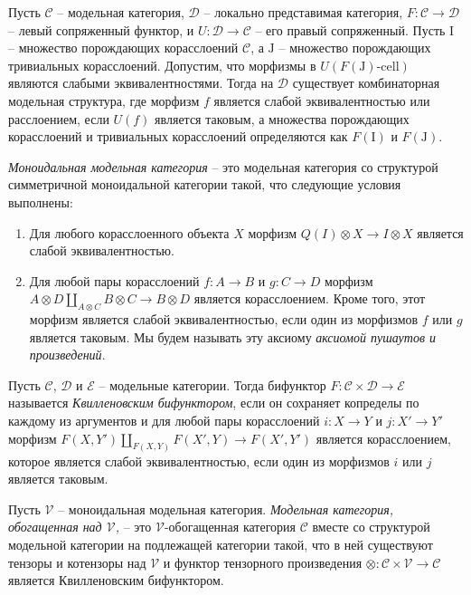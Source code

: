 \documentclass[reqno]{amsart}
\theoremstyle{definition}
\theoremstyle{remark}
\newcommand{\cat}[1]{\mathcal{#1}}
\renewcommand{\C}{\cat{C}}
\newcommand{\D}{\cat{D}}
\newcommand{\I}{\mathrm{I}}
\newcommand{\J}{\mathrm{J}}
\newcommand{\class}[2]{#1\text{-}\mathrm{#2}}
\newcommand{\Icell}[1][\I]{\class{#1}{cell}}
\begin{document}
\begin{prop}[transferred]
Пусть $\C$ -- модельная категория, $\D$ -- локально представимая категория, $F : \C \to \D$ -- левый сопряженный функтор, и $U : \D \to \C$ -- его правый сопряженный.
Пусть $\I$ -- множество порождающих корасслоений $\C$, а $\J$ -- множество порождающих тривиальных корасслоений.
Допустим, что морфизмы в $U(\Icell[F(\J)])$ являются слабыми эквивалентностями.
Тогда на $\D$ существует комбинаторная модельная структура, где морфизм $f$ является слабой эквивалентностью или расслоением, если $U(f)$ является таковым,
а множества порождающих корасслоений и тривиальных корасслоений определяются как $F(\I)$ и $F(\J)$.
\end{prop} 

\begin{defn}
\emph{Моноидальная модельная категория} -- это модельная категория со структурой симметричной моноидальной категории такой, что следующие условия выполнены:
\begin{enumerate}
\item Для любого корасслоенного объекта $X$ морфизм $Q(I) \otimes X \to I \otimes X$ является слабой эквивалентностью.
\item Для любой пары корасслоений $f : A \to B$ и $g : C \to D$ морфизм $A \otimes D \amalg_{A \otimes C} B \otimes C \to B \otimes D$ является корасслоением.
Кроме того, этот морфизм является слабой эквивалентностью, если один из морфизмов $f$ или $g$ является таковым. Мы будем называть эту аксиому \emph{аксиомой пушаутов и произведений}.
\end{enumerate}
\end{defn}

\begin{defn}
Пусть $\C$, $\D$ и $\cat{E}$ -- модельные категории.
Тогда бифунктор $F : \C \times \D \to \cat{E}$ называется \emph{Квилленовским бифунктором}, если он сохраняет копределы по каждому из аргументов и для любой пары корасслоений $i : X \to Y$ и $j : X' \to Y'$
морфизм $F(X,Y') \amalg_{F(X,Y)} F(X',Y) \to F(X',Y')$ является корасслоением, которое является слабой эквивалентностью, если один из морфизмов $i$ или $j$ является таковым.
\end{defn}

\begin{defn}
Пусть $\cat{V}$ -- моноидальная модельная категория.
\emph{Модельная категория, обогащенная над $\cat{V}$,} -- это $\cat{V}$-обогащенная категория $\C$ вместе со структурой модельной категории на подлежащей категории такой,
что в ней существуют тензоры и котензоры над $\cat{V}$ и функтор тензорного произведения $\otimes : \C \times \cat{V} \to \C$ является Квилленовским бифунктором.
\end{defn}
\end{document}
